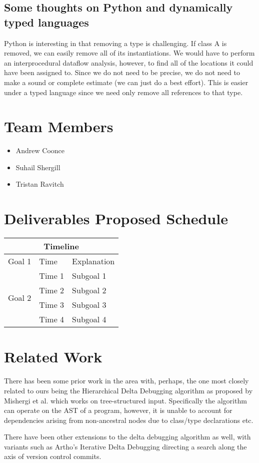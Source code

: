 \documentclass[11pt]{article}
\begin{document}
\subsection{Some thoughts on Python and dynamically typed languages}
Python is interesting in that removing a type is challenging. If class A is
removed, we can easily remove all of its instantiations. We would have to
perform an interprocedural dataflow analysis, however, to find all of the
locations it could have been assigned to. Since we do not need to be precise, we
do not need to make a sound or complete estimate (we can just do a best
effort). This is easier under a typed language since we need only remove all
references to that type.


\section{Team Members}
\begin{itemize}
\item{Andrew Coonce}
\item{Suhail Shergill}
\item{Tristan Ravitch}
\end{itemize}

\section{Deliverables Proposed Schedule}
\begin{tabular}{|l|l|l|}
\hline
\multicolumn{3}{|c|}{Timeline} \\
\hline
Goal 1 & Time & Explanation \\ \hline
\multirow{4}{*}{Goal 2} & Time 1 & Subgoal 1 \\
 & Time 2 & Subgoal 2 \\
 & Time 3 & Subgoal 3 \\
 & Time 4 & Subgoal 4 \\ \hline
\end{tabular}



\section{Related Work}
There has been some prior work in the area with, perhaps, the one most closely
related to ours being the Hierarchical Delta Debugging algorithm as proposed by
Mishergi et al. \cite{hdd} which works on tree-structured input. Specifically
the algorithm can operate on the AST of a program, however, it is unable to
account for dependencies arising from non-ancestral nodes due to class/type
declarations etc.

There have been other extensions to the delta debugging algorithm as well, with
variants such as Artho's Iterative Delta Debugging \cite{idd} directing a search
along the axis of version control commits.



\end{document}
